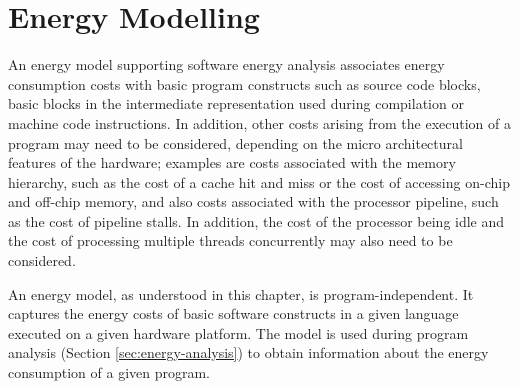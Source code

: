 \nopagebreak
\section{Energy Modelling}\label{sec:energy-models}


An energy model supporting 
software energy analysis 
associates energy 
consumption costs
with 
basic
program constructs such as source code blocks, basic blocks in the intermediate representation 
used during compilation or machine code instructions.
In addition, other costs arising from the execution of a program may need to be considered, depending on the micro architectural features of the hardware; examples are costs associated with the memory hierarchy, such as the cost of a cache hit and miss or the cost of accessing on-chip and off-chip memory, and also costs associated with the processor pipeline, such as the cost of pipeline stalls. In addition, the cost of the processor being idle and the cost of processing multiple threads concurrently may also need to be considered. 

An energy model, as understood in this chapter, is program-independent.  It captures the energy costs of basic software constructs in a given language executed on a given hardware platform. The model is used during program analysis (Section \ref{sec:energy-analysis}) to obtain information about the energy consumption of a given program.
%

